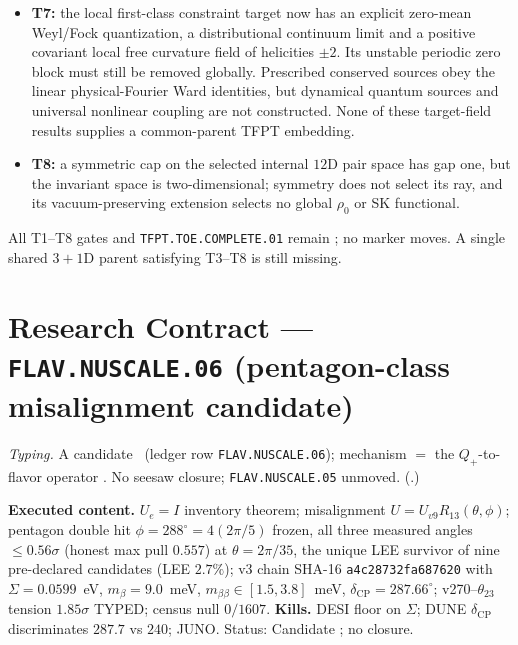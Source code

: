 \documentclass[11pt,a4paper]{article}
\begin{document}
\begin{itemize}
  link truncation and full $192$-mode site character), but give no canonical
  compatible clock family or neutrino mass texture. The symmetric candidate
  forbids every Majorana bilinear.
\item \textbf{T7:} the local first-class constraint target now has an explicit
  zero-mean Weyl/Fock quantization, a distributional continuum limit and a
  positive covariant local free curvature field of helicities $\pm2$.
  Its unstable periodic zero block must still be removed globally.
  Prescribed conserved sources obey the linear physical-Fourier Ward
  identities, but dynamical quantum sources and universal nonlinear
  coupling are not constructed. None of these target-field results
  supplies a common-parent TFPT embedding.
\item \textbf{T8:} a symmetric cap on the selected internal $12$D pair space has gap one, but the
  invariant space is two-dimensional; symmetry does not select its ray,
  and its vacuum-preserving extension selects no global $\rho_0$ or SK functional.
\end{itemize}
All T1--T8 gates and \texttt{TFPT.TOE.COMPLETE.01} remain \mO; no marker moves.
A single shared $3{+}1$D parent satisfying T3--T8 is still missing.







\section*{Research Contract --- \texttt{FLAV.NUSCALE.06} (pentagon-class misalignment candidate)}
\noindent\emph{Typing.} A candidate \mC\ (ledger row \texttt{FLAV.NUSCALE.06}); mechanism $=$
the $Q_+$-to-flavor operator \mO.  No seesaw closure; \texttt{FLAV.NUSCALE.05} unmoved.
(.)

\par\smallskip\noindent\textbf{Executed content.}  $U_e=I$ inventory theorem; misalignment
$U=U_{v9}R_{13}(\theta,\phi)$; pentagon double hit $\phi=288^\circ=4(2\pi/5)$ frozen, all three
measured angles $\le0.56\sigma$ (honest max pull $0.557$) at $\theta=2\pi/35$, the unique LEE
survivor of nine pre-declared candidates (LEE $2.7\%$); v3 chain SHA-16
\texttt{a4c28732fa687620} with $\Sigma=0.0599$~eV, $m_\beta=9.0$~meV,
$m_{\beta\beta}\in[1.5,3.8]$~meV, $\delta_{\mathrm{CP}}=287.66^\circ$; v270--$\theta_{23}$
tension $1.85\sigma$ TYPED; census null $0/1607$.
\textbf{Kills.} DESI floor on $\Sigma$; DUNE $\delta_{\mathrm{CP}}$ discriminates $287.7$ vs
$240$; JUNO.  Status: Candidate \mC; no closure.
\end{document}
